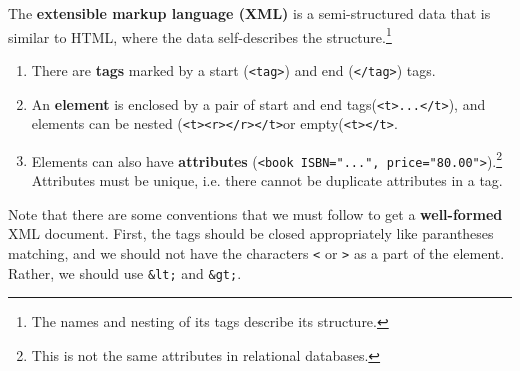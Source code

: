 \documentclass{article}
\begin{document}
    \begin{definition}[XML]
      The \textbf{extensible markup language (XML)} is a semi-structured data that is similar to HTML, where the data self-describes the structure.\footnote{The names and nesting of its tags describe its structure.} 
      \begin{enumerate}
        \item There are \textbf{tags} marked by a start (\texttt{<tag>}) and end (\texttt{</tag>}) tags. 
        \item An \textbf{element} is enclosed by a pair of start and end tags(\texttt{<t>...</t>}), and elements can be nested (\texttt{<t><r></r></t>}or empty(\texttt{<t></t>}.  
        \item Elements can also have \textbf{attributes} (\texttt{<book ISBN="...", price="80.00">}).\footnote{This is not the same attributes in relational databases.} Attributes must be unique, i.e. there cannot be duplicate attributes in a tag. 
      \end{enumerate}
      Note that there are some conventions that we must follow to get a \textbf{well-formed} XML document. First, the tags should be closed appropriately like parantheses matching, and we should not have the characters \texttt{<} or \texttt{>} as a part of the element. Rather, we should use \texttt{\&lt;} and \texttt{\&gt;}. 
    \end{definition}
\end{document}
